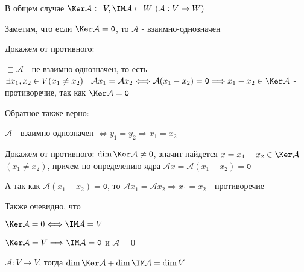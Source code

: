 \documentclass[12pt]{article}
\begin{document}
    В общем случае $\Ker \mathcal{A} \subset V, \IM \mathcal{A} \subset W \ (\mathcal{A} : V \rightarrow W)$

    \mediumvspace

    Заметим, что если $\Ker \mathcal{A} = \texttt{0}$, то $\mathcal{A}$ - взаимно-однозначен

    \begin{MyProof}
        Докажем от противного:

        $\sqsupset \mathcal{A}$ - не взаимно-однозначен, то есть 
        $\exists x_1, x_2 \in V (x_1 \neq x_2) \ | \ \mathcal{A}x_1 = \mathcal{A}x_2 \Longleftrightarrow 
        \mathcal{A} (x_1 - x_2) = \texttt{0} \Longrightarrow x_1 - x_2 \in \Ker \mathcal{A}$ - 
        противоречие, так как $\Ker \mathcal{A} = \texttt{0}$
    \end{MyProof}

    \Notas Обратное также верно:

    \begin{MyProof}
        $\mathcal{A}$ - взаимно-однозначен $\Longleftrightarrow y_1 = y_2 \Longrightarrow x_1 = x_2$

        Докажем от противного: $\dim \Ker \mathcal{A} \neq 0$, значит найдется $x = x_1 - x_2 \in \Ker \mathcal{A}$ $(x_1 \neq x_2)$, 
        причем по определению ядра $\mathcal{A} x = \mathcal{A} (x_1 - x_2) = \texttt{0}$

        А так как $\mathcal{A} (x_1 - x_2) = \texttt{0}$, то $\mathcal{A} x_1 = \mathcal{A} x_2 \Longrightarrow x_1 = x_2$ - противоречие
    \end{MyProof}

    \Nota Также очевидно, что

    $\Ker \mathcal{A} = 0 \Longleftrightarrow \IM \mathcal{A} = V$

    $\Ker \mathcal{A} = V \Longrightarrow \IM \mathcal{A} = \texttt{0}$ и $\mathcal{A} = 0$

    \hypertarget{theoremaboutdimensions}{}

    \begin{MyTheorem}
        \Ths $\mathcal{A} : V \rightarrow V$, тогда $\dim \Ker \mathcal{A} + \dim \IM \mathcal{A} = \dim V$
    \end{MyTheorem}
\end{document}
